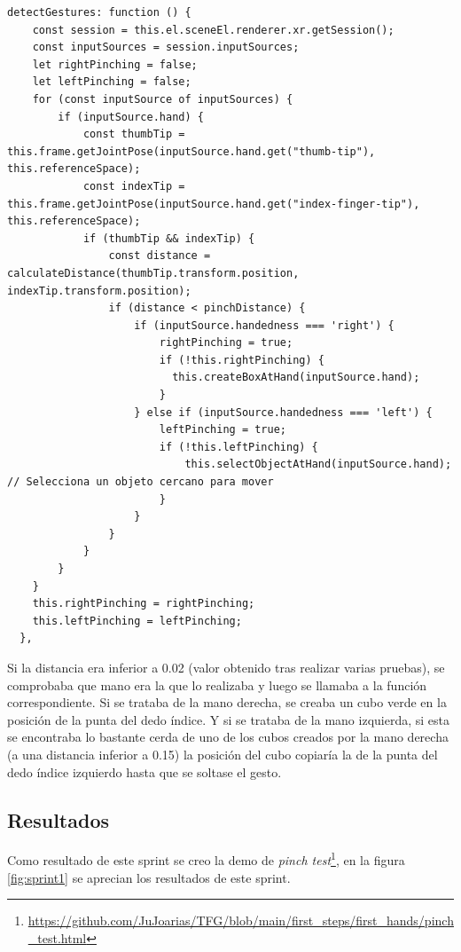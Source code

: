 \documentclass[a4paper, 12pt]{book}
\begin{document}
\begin{lstlisting}[caption=Función detectGestures, captionpos=b, label=lst:firstdetectGesture]
  detectGestures: function () {
    const session = this.el.sceneEl.renderer.xr.getSession();
    const inputSources = session.inputSources;
    let rightPinching = false;
    let leftPinching = false;
    for (const inputSource of inputSources) {
        if (inputSource.hand) {
            const thumbTip = this.frame.getJointPose(inputSource.hand.get("thumb-tip"), this.referenceSpace);
            const indexTip = this.frame.getJointPose(inputSource.hand.get("index-finger-tip"), this.referenceSpace);
            if (thumbTip && indexTip) {
                const distance = calculateDistance(thumbTip.transform.position, indexTip.transform.position);
                if (distance < pinchDistance) {
                    if (inputSource.handedness === 'right') {
                        rightPinching = true;
                        if (!this.rightPinching) {
                          this.createBoxAtHand(inputSource.hand);  
                        }
                    } else if (inputSource.handedness === 'left') {
                        leftPinching = true;
                        if (!this.leftPinching) {
                            this.selectObjectAtHand(inputSource.hand); // Selecciona un objeto cercano para mover
                        }
                    }
                }
            }
        }
    }
    this.rightPinching = rightPinching;
    this.leftPinching = leftPinching;
  },
\end{lstlisting}

Si la distancia era inferior a 0.02 (valor obtenido tras realizar varias pruebas), se comprobaba que mano era la que lo realizaba y luego se llamaba a la función correspondiente. 
Si se trataba de la mano derecha, se creaba un cubo verde en la posición de la punta del dedo índice. Y si se trataba de la mano izquierda, si esta se encontraba lo bastante cerda de uno de los cubos creados por la mano derecha (a una distancia inferior a 0.15) la posición del cubo copiaría la de la punta del dedo índice izquierdo hasta que se soltase el gesto.


\subsection{Resultados}
\label{subsec:resultados1}

Como resultado de este sprint se creo la demo de \textit{pinch test}\footnote{\url{https://github.com/JuJoarias/TFG/blob/main/first_steps/first_hands/pinch_test.html}}, en la figura \ref{fig:sprint1} se aprecian los resultados de este sprint.
\end{document}
